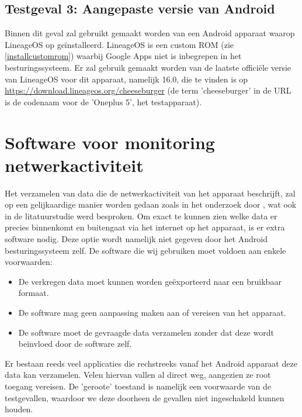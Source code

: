 
\subsection{Testgeval 3: Aangepaste versie van Android}
\label{sec:testgeval3}
Binnen dit geval zal gebruikt gemaakt worden van een Android apparaat waarop LineageOS op geïnstalleerd. LineageOS is een custom ROM (zie \ref{installcustomrom}) waarbij Google Apps niet is inbegrepen in het besturingssysteem. Er zal gebruik gemaakt worden van de laatste officiële versie van LineageOS voor dit apparaat, namelijk 16.0, die te vinden is op \url{https://download.lineageos.org/cheeseburger} (de term 'cheeseburger' in de URL is de codenaam voor de 'Oneplus 5', het testapparaat).


\section{Software voor monitoring netwerkactiviteit}
\label{sec:metingsoftware}
Het verzamelen van data die de netwerkactiviteit van het apparaat beschrijft, zal op een gelijkaardige manier worden gedaan zoals in het onderzoek door \cite{schmidt_google-data-collection}, wat ook in de litatuurstudie werd besproken. Om exact te kunnen zien welke data er precies binnenkomt en buitengaat via het internet op het apparaat, is er extra software nodig. Deze optie wordt namelijk niet gegeven door het Android besturingssysteem zelf. De software die wij gebruiken moet voldoen aan enkele voorwaarden:
\begin{itemize}
    \item De verkregen data moet kunnen worden geëxporteerd naar een bruikbaar formaat.
    \item De software mag geen aanpassing maken aan of vereisen van het apparaat.
    \item De software moet de gevraagde data verzamelen zonder dat deze wordt beïnvloed door de software zelf.
\end{itemize}
Er bestaan reeds veel applicaties die rechstreeks vanaf het Android apparaat deze data kan verzamelen. Velen hiervan vallen al direct weg, aangezien ze root toegang vereisen. De 'geroote' toestand is namelijk een voorwaarde van de testgevallen, waardoor we deze doorheen de gevallen niet ingeschakeld kunnen houden. 

